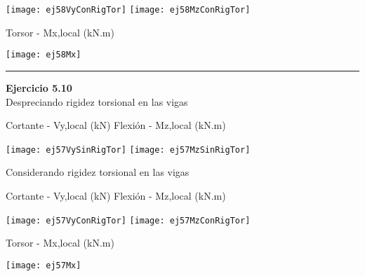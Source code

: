 \texttt{[image: ej58VyConRigTor]}
\texttt{[image: ej58MzConRigTor]}

\begin{center}
	
	Torsor - Mx,local (kN.m)
	
	\texttt{[image: ej58Mx]}
	
\end{center}





\hrule
\vspace{5mm}
\textbf{Ejercicio 5.10}\\

Despreciando rigidez torsional en las vigas

\noindent
Cortante - Vy,local (kN)
\hfill
Flexión - Mz,local (kN.m)

\texttt{[image: ej57VySinRigTor]}
\texttt{[image: ej57MzSinRigTor]}


Considerando rigidez torsional en las vigas


\noindent
Cortante - Vy,local (kN)
\hfill
Flexión - Mz,local (kN.m)


\texttt{[image: ej57VyConRigTor]}
\texttt{[image: ej57MzConRigTor]}

\begin{center}
	
	Torsor - Mx,local (kN.m)
	
	\texttt{[image: ej57Mx]}
	
\end{center}



